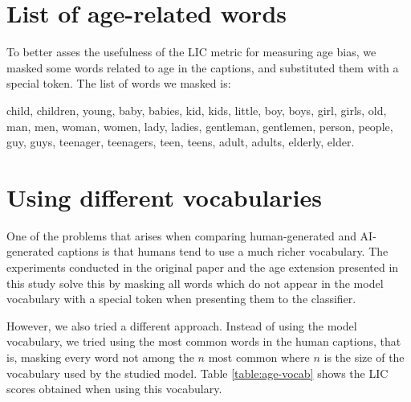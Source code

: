 \section{List of age-related words}
\label{app:agewords}

To better asses the usefulness of the LIC metric for measuring age bias, we masked some words related to age in the captions, and substituted them with a special token. The list of words we masked is: \par

child, children, young, baby, babies, kid, kids, little, boy, boys, girl, girls, old, man, men, woman, women, lady, ladies, gentleman, gentlemen, person, people, guy, guys, teenager, teenagers, teen, teens, adult, adults, elderly, elder.


\section{Using different vocabularies}

One of the problems that arises when comparing human-generated and AI-generated captions is that humans tend to use a much richer vocabulary. The experiments conducted in the original paper \cite{Hirota2022} and the age extension presented in this study solve this by masking all words which do not appear in the model vocabulary with a special token when presenting them to the classifier.

However, we also tried a different approach. Instead of using the model vocabulary, we tried using the most common words in the human captions, that is, masking every word not among the $n$ most common where $n$ is the size of the vocabulary used by the studied model. Table \ref{table:age-vocab} shows the LIC scores obtained when using this vocabulary.

